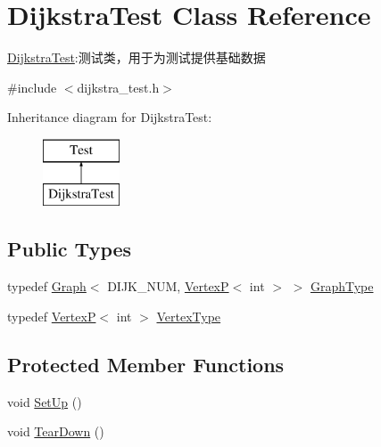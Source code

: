 \hypertarget{class_dijkstra_test}{}\section{Dijkstra\+Test Class Reference}
\label{class_dijkstra_test}


\hyperlink{class_dijkstra_test}{Dijkstra\+Test}\+:测试类，用于为测试提供基础数据  




{\ttfamily \#include $<$dijkstra\+\_\+test.\+h$>$}

Inheritance diagram for Dijkstra\+Test\+:\begin{figure}[H]
\begin{center}
\leavevmode
\includegraphics[height=2.000000cm]{class_dijkstra_test}
\end{center}
\end{figure}
\subsection*{Public Types}
\begin{DoxyCompactItemize}
\item 
typedef \hyperlink{struct_introduction_to_algorithm_1_1_graph_algorithm_1_1_graph}{Graph}$<$ D\+I\+J\+K\+\_\+\+N\+U\+M, \hyperlink{struct_introduction_to_algorithm_1_1_graph_algorithm_1_1_vertex_p}{Vertex\+P}$<$ int $>$ $>$ \hyperlink{class_dijkstra_test_af1d630aa34cb90e7bc11e2bcef82a2d7}{Graph\+Type}
\item 
typedef \hyperlink{struct_introduction_to_algorithm_1_1_graph_algorithm_1_1_vertex_p}{Vertex\+P}$<$ int $>$ \hyperlink{class_dijkstra_test_a00c55e6277edc6a0c52fc589df07d586}{Vertex\+Type}
\end{DoxyCompactItemize}
\subsection*{Protected Member Functions}
\begin{DoxyCompactItemize}
\item 
void \hyperlink{class_dijkstra_test_a112fd6757f4daff43c704f7f808a2ba4}{Set\+Up} ()
\item 
void \hyperlink{class_dijkstra_test_a8147e068ecc6561235948c254a4677a5}{Tear\+Down} ()
\end{DoxyCompactItemize}

